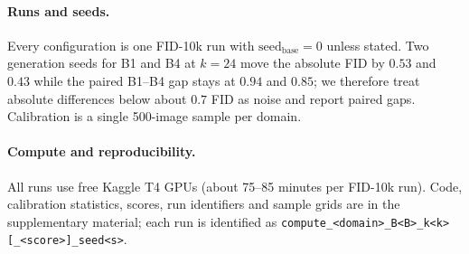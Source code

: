 \paragraph{Runs and seeds.}
Every configuration is one FID-10k run with $\text{seed}_{\text{base}}=0$ unless stated. Two generation seeds for B1 and B4 at $k=24$ move the absolute FID by $0.53$ and $0.43$ while the paired B1--B4 gap stays at $0.94$ and $0.85$; we therefore treat absolute differences below about $0.7$ FID as noise and report paired gaps. 
Calibration is a single 500-image sample per domain. 

\paragraph{Compute and reproducibility.}
All runs use free Kaggle T4 GPUs (about 75--85 minutes per FID-10k run). Code, calibration statistics, scores, run identifiers and sample grids are in the supplementary material; each run is identified as \texttt{compute\_<domain>\_B<B>\_k<k>[\_<score>]\_seed<s>}.
